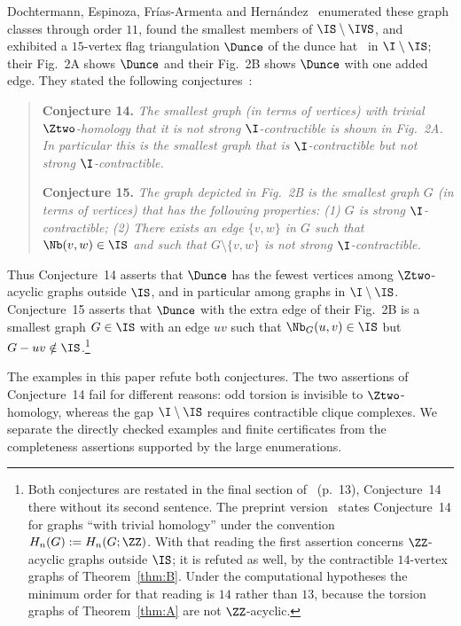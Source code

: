 Dochtermann, Espinoza, Fr\'ias-Armenta and Hern\'andez~\cite{DEFH2023} enumerated these graph classes through order $11$, found the smallest members of $\IS\setminus\IVS$, and exhibited a $15$-vertex flag triangulation $\Dunce$ of the dunce hat~\cite{Zeeman1963} in $\I\setminus\IS$; their Fig.~2A shows $\Dunce$ and their Fig.~2B shows $\Dunce$ with one added edge. They stated the following conjectures~\cite[pp.~8--9]{DEFH2023}:
\begin{quote}\small
\textbf{Conjecture 14.} \emph{The smallest graph (in terms of vertices) with trivial $\Ztwo$-homology that it is not strong $\I$-contractible is shown in Fig.~2A. In particular this is the smallest graph that is $\I$-contractible but not strong $\I$-contractible.}

\smallskip
\textbf{Conjecture 15.} \emph{The graph depicted in Fig.~2B is the smallest graph $G$ (in terms of vertices) that has the following properties: \textup{(1)} $G$ is strong $\I$-contractible; \textup{(2)} There exists an edge $\{v,w\}$ in $G$ such that $\Nb(v,w)\in\IS$ and such that $G\setminus\{v,w\}$ is not strong $\I$-contractible.}
\end{quote}
Thus Conjecture~14 asserts that $\Dunce$ has the fewest vertices among $\Ztwo$-acyclic graphs outside $\IS$, and in particular among graphs in $\I\setminus\IS$. Conjecture~15 asserts that $\Dunce$ with the extra edge of their Fig.~2B is a smallest graph $G\in\IS$ with an edge $uv$ such that $\Nb_G(u,v)\in\IS$ but $G-uv\notin\IS$.\footnote{Both conjectures are restated in the final section of~\cite{DEFH2023} (p.~13), Conjecture~14 there without its second sentence. The preprint version~\cite{DEFH2022arXiv} states Conjecture~14 for graphs ``with trivial homology'' under the convention $H_n(G):=H_n(G;\ZZ)$. With that reading the first assertion concerns $\ZZ$-acyclic graphs outside $\IS$; it is refuted as well, by the contractible $14$-vertex graphs of Theorem~\ref{thm:B}. Under the computational hypotheses the minimum order for that reading is $14$ rather than $13$, because the torsion graphs of Theorem~\ref{thm:A} are not $\ZZ$-acyclic.}

The examples in this paper refute both conjectures. The two assertions of Conjecture~14 fail for different reasons: odd torsion is invisible to $\Ztwo$-homology, whereas the gap $\I\setminus\IS$ requires contractible clique complexes. We separate the directly checked examples and finite certificates from the completeness assertions supported by the large enumerations.

